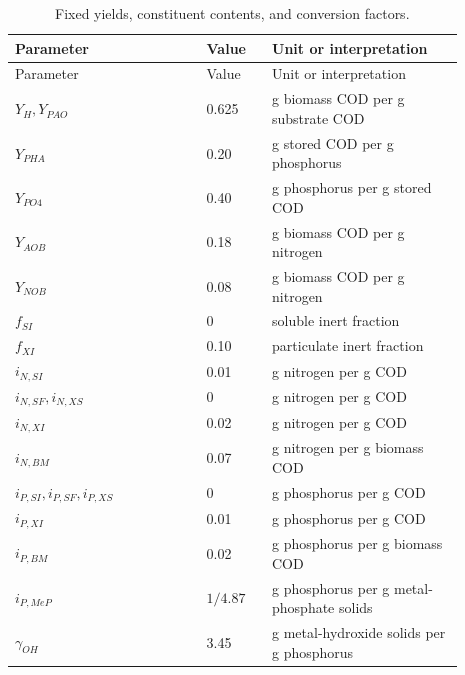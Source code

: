 \begin{longtable}{p{0.38\linewidth}p{0.13\linewidth}p{0.38\linewidth}}
\caption{Fixed yields, constituent contents, and conversion factors.}\label{tab:plant_stoichiometric_constants}\\
\toprule Parameter & Value & Unit or interpretation\\\midrule\endfirsthead
\toprule Parameter & Value & Unit or interpretation\\\midrule\endhead
$Y_H,Y_{PAO}$ & 0.625 & g biomass COD per g substrate COD\\
$Y_{PHA}$ & 0.20 & g stored COD per g phosphorus\\
$Y_{PO4}$ & 0.40 & g phosphorus per g stored COD\\
$Y_{AOB}$ & 0.18 & g biomass COD per g nitrogen\\
$Y_{NOB}$ & 0.08 & g biomass COD per g nitrogen\\
$f_{SI}$ & 0 & soluble inert fraction\\
$f_{XI}$ & 0.10 & particulate inert fraction\\
$i_{N,SI}$ & 0.01 & g nitrogen per g COD\\
$i_{N,SF},i_{N,XS}$ & 0 & g nitrogen per g COD\\
$i_{N,XI}$ & 0.02 & g nitrogen per g COD\\
$i_{N,BM}$ & 0.07 & g nitrogen per g biomass COD\\
$i_{P,SI},i_{P,SF},i_{P,XS}$ & 0 & g phosphorus per g COD\\
$i_{P,XI}$ & 0.01 & g phosphorus per g COD\\
$i_{P,BM}$ & 0.02 & g phosphorus per g biomass COD\\
$i_{P,MeP}$ & $1/4.87$ & g phosphorus per g metal-phosphate solids\\
$\gamma_{OH}$ & 3.45 & g metal-hydroxide solids per g phosphorus\\
\bottomrule
\end{longtable}

